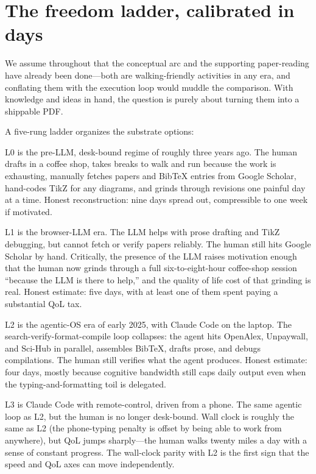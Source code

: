 \documentclass[11pt]{article}
\begin{document}
\section{The freedom ladder, calibrated in days}

We assume throughout that the conceptual arc and the supporting paper-reading have already been done---both are walking-friendly activities in any era, and conflating them with the execution loop would muddle the comparison. With knowledge and ideas in hand, the question is purely about turning them into a shippable PDF.

A five-rung ladder organizes the substrate options:

L0 is the pre-LLM, desk-bound regime of roughly three years ago. The human drafts in a coffee shop, takes breaks to walk and run because the work is exhausting, manually fetches papers and BibTeX entries from Google Scholar, hand-codes TikZ for any diagrams, and grinds through revisions one painful day at a time. Honest reconstruction: nine days spread out, compressible to one week if motivated.

L1 is the browser-LLM era. The LLM helps with prose drafting and TikZ debugging, but cannot fetch or verify papers reliably. The human still hits Google Scholar by hand. Critically, the presence of the LLM raises motivation enough that the human now grinds through a full six-to-eight-hour coffee-shop session ``because the LLM is there to help,'' and the quality of life cost of that grinding is real. Honest estimate: five days, with at least one of them spent paying a substantial QoL tax.

L2 is the agentic-OS era of early 2025, with Claude Code on the laptop. The search-verify-format-compile loop collapses: the agent hits OpenAlex, Unpaywall, and Sci-Hub in parallel, assembles BibTeX, drafts prose, and debugs compilations. The human still verifies what the agent produces. Honest estimate: four days, mostly because cognitive bandwidth still caps daily output even when the typing-and-formatting toil is delegated.

L3 is Claude Code with remote-control, driven from a phone. The same agentic loop as L2, but the human is no longer desk-bound. Wall clock is roughly the same as L2 (the phone-typing penalty is offset by being able to work from anywhere), but QoL jumps sharply---the human walks twenty miles a day with a sense of constant progress. The wall-clock parity with L2 is the first sign that the speed and QoL axes can move independently.
\end{document}
